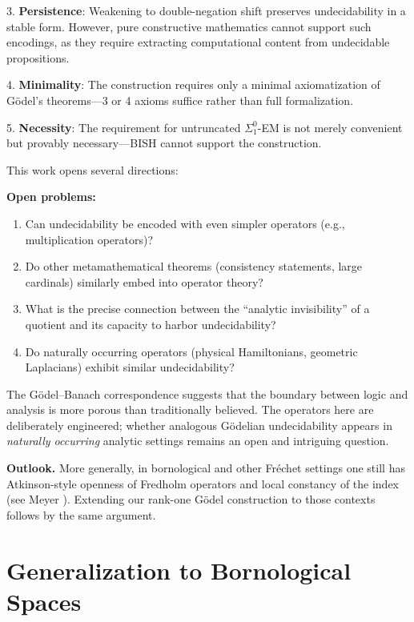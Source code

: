 \documentclass[11pt]{article}
\theoremstyle{definition}
\newcommand{\SigOne}{\Sigma^{0}_{\!1}}
\begin{document}
3. \textbf{Persistence}: Weakening to double-negation shift preserves undecidability in a stable form. However, pure constructive mathematics cannot support such encodings, as they require extracting computational content from undecidable propositions.

4. \textbf{Minimality}: The construction requires only a minimal axiomatization of Gödel's theorems---3 or 4 axioms suffice rather than full formalization.

5. \textbf{Necessity}: The requirement for untruncated $\SigOne$-EM is not merely convenient but provably necessary---BISH cannot support the construction.

This work opens several directions:

\begin{mdframed}[roundcorner=4pt]
\textbf{Open problems:}
\begin{enumerate}
\item Can undecidability be encoded with even simpler operators (e.g., multiplication operators)?
\item Do other metamathematical theorems (consistency statements, large cardinals) similarly embed into operator theory?
\item What is the precise connection between the ``analytic invisibility'' of a quotient and its capacity to harbor undecidability?
\item Do naturally occurring operators (physical Hamiltonians, geometric Laplacians) exhibit similar undecidability?
\end{enumerate}
\end{mdframed}

The Gödel--Banach correspondence suggests that the boundary between logic and analysis is more porous than traditionally believed. The operators here are deliberately engineered; whether analogous Gödelian undecidability appears in \emph{naturally occurring} analytic settings remains an open and intriguing question.

\textbf{Outlook.} More generally, in bornological and other Fréchet settings one still has Atkinson-style openness of Fredholm operators and local constancy of the index (see Meyer \cite{Mey99}). Extending our rank-one Gödel construction to those contexts follows by the same argument.

\appendix


\appendix
\section{Generalization to Bornological Spaces}
\label{sec:appendix}
\end{document}
